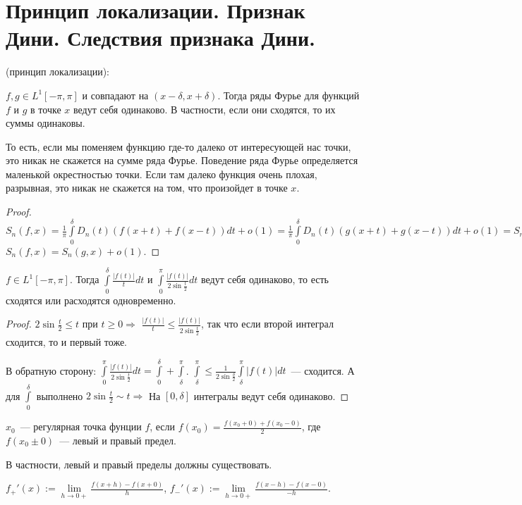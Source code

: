 \section{Принцип локализации. Признак Дини.
Следствия признака Дини.}

\begin{theorem} (принцип локализации):

    $f, g \in L^1 [-\pi, \pi]$ и совпадают на $(x - \delta, x + \delta)$. Тогда ряды Фурье для функций $f$ и $g$ в точке $x$
    ведут себя одинаково. В частности, если они сходятся, то их суммы одинаковы.

    То есть, если мы поменяем функцию где-то далеко от интересующей нас точки, это никак не скажется на сумме ряда Фурье. Поведение ряда Фурье определяется маленькой окрестностью точки. Если там далеко функция очень плохая, разрывная, это никак не скажется на том, что произойдет в точке $x$.
\end{theorem}

\begin{proof}
    $S_n(f, x) = \frac{1}{\pi} \int \limits_{0}^{\delta} D_n(t) (f(x + t) + f(x - t)) dt + o(1) =
        \frac{1}{\pi} \int \limits_{0}^{\delta} D_n(t) (g(x + t) + g(x - t)) dt + o(1) = S_n(g, x) \Rightarrow$
    $S_n(f, x) = S_n(g, x) + o(1)$.
\end{proof}

\begin{lemma}
    $f \in L^1 [-\pi, \pi]$. Тогда $\int \limits_{0}^{\delta} \frac{|f(t)|}{t} dt$ и
    $\int \limits_{0}^{\pi} \frac{|f(t)|}{2 \sin \frac{t}{2}} dt$ ведут себя одинаково, то есть сходятся или расходятся одновременно.
\end{lemma}

\begin{proof}
    $2 \sin \frac{t}{2} \le t$ при $t \ge 0 \Rightarrow$
    $\frac{|f(t)|}{t} \le \frac{|f(t)|}{2 \sin \frac{t}{2}}$, так что если второй интеграл сходится, то и первый тоже.

    В обратную сторону:
    $\int \limits_{0}^{\pi} \frac{|f(t)|}{2 \sin \frac{t}{2}} dt = \int \limits_{0}^{\delta} + \int \limits_{\delta}^{\pi}$.
    $\int \limits_{\delta}^{\pi} \le \frac{1}{2 \sin \frac{\delta}{2}} \int \limits_{\delta}^{\pi} |f(t)| dt$~--- сходится.
    А для $\int \limits_{0}^{\delta}$ выполнено $2 \sin \frac{t}{2} \sim t \Rightarrow$
    На $[0, \delta]$ интегралы ведут себя одинаково.
\end{proof}

\begin{definition}
    $x_0$~--- регулярная точка фунции $f$, если $f(x_0) = \frac{f(x_0 + 0) + f(x_0 - 0)}{2}$, где
    $f(x_0 \pm 0)$~--- левый и правый предел.

    В частности, левый и правый пределы должны существовать.

    $f_+'(x) := \lim \limits_{h \to 0+} \frac{f(x + h) - f(x + 0)}{h}$,
    $f_-'(x) := \lim \limits_{h \to 0+} \frac{f(x - h) - f(x - 0)}{-h}$.
\end{definition}

